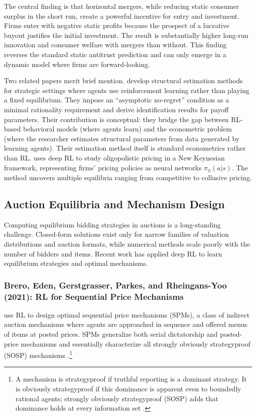 The central finding is that horizontal mergers, while reducing static consumer surplus in the short run, create a powerful incentive for entry and investment. Firms enter with negative static profits because the prospect of a lucrative buyout justifies the initial investment. The result is substantially higher long-run innovation and consumer welfare with mergers than without. This finding reverses the standard static antitrust prediction and can only emerge in a dynamic model where firms are forward-looking.

Two related papers merit brief mention. \citet{LomysMagnolfi2024} develop structural estimation methods for strategic settings where agents use reinforcement learning rather than playing a fixed equilibrium. They impose an ``asymptotic no-regret'' condition as a minimal rationality requirement and derive identification results for payoff parameters. Their contribution is conceptual: they bridge the gap between RL-based behavioral models (where agents learn) and the econometric problem (where the researcher estimates structural parameters from data generated by learning agents). Their estimation method itself is standard econometrics rather than RL. \citet{Covarrubias2022} uses deep RL to study oligopolistic pricing in a New Keynesian framework, representing firms' pricing policies as neural networks $\pi_\phi(a|s)$. The method uncovers multiple equilibria ranging from competitive to collusive pricing.


\subsection{Auction Equilibria and Mechanism Design}

Computing equilibrium bidding strategies in auctions is a long-standing challenge. Closed-form solutions exist only for narrow families of valuation distributions and auction formats, while numerical methods scale poorly with the number of bidders and items. Recent work has applied deep RL to learn equilibrium strategies and optimal mechanisms.


\subsubsection{Brero, Eden, Gerstgrasser, Parkes, and Rheingans-Yoo (2021): RL for Sequential Price Mechanisms}

\citet{BreroEtAl2021} use RL to design optimal sequential price mechanisms (SPMs), a class of indirect auction mechanisms where agents are approached in sequence and offered menus of items at posted prices. SPMs generalize both serial dictatorship and posted-price mechanisms and essentially characterize all strongly obviously strategyproof (SOSP) mechanisms \citep{PyciaAndTroyan2019}.\footnote{A mechanism is strategyproof if truthful reporting is a dominant strategy. It is obviously strategyproof if this dominance is apparent even to boundedly rational agents; strongly obviously strategyproof (SOSP) adds that dominance holds at every information set \citep{PyciaAndTroyan2019}.}

